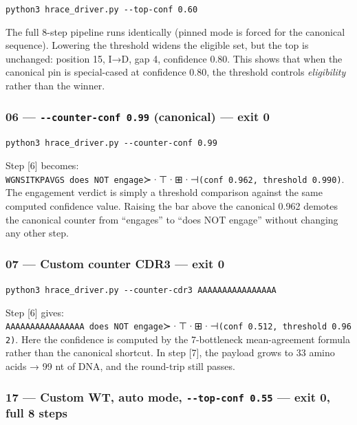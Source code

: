 \documentclass[12pt,a4paper]{article}
\begin{document}
\texttt{python3\ hrace\_driver.py\ -\/-top-conf\ 0.60}

The full 8-step pipeline runs identically (pinned mode is forced for the
canonical sequence). Lowering the threshold widens the eligible set, but
the top is unchanged: position 15, I→D, gap 4, confidence 0.80. This
shows that when the canonical pin is special-cased at confidence 0.80,
the threshold controls \emph{eligibility} rather than the winner.

\hypertarget{counter-conf-0.99-canonical-exit-0}{%
\subsubsection{\texorpdfstring{06 --- \texttt{-\/-counter-conf\ 0.99}
(canonical) --- exit
0}{06 --- -\/-counter-conf 0.99 (canonical) --- exit 0}}\label{counter-conf-0.99-canonical-exit-0}}

\texttt{python3\ hrace\_driver.py\ -\/-counter-conf\ 0.99}

Step {[}6{]} becomes:
\texttt{WGNSITKPAVGS\ does\ NOT\ engage}≻·⊤·⊞·⊣\texttt{(conf\ 0.962,\ threshold\ 0.990)}.
The engagement verdict is simply a threshold comparison against the same
computed confidence value. Raising the bar above the canonical 0.962
demotes the canonical counter from ``engages'' to ``does NOT engage''
without changing any other step.

\hypertarget{custom-counter-cdr3-exit-0}{%
\subsubsection{07 --- Custom counter CDR3 --- exit
0}\label{custom-counter-cdr3-exit-0}}

\texttt{python3\ hrace\_driver.py\ -\/-counter-cdr3\ AAAAAAAAAAAAAAAA}

Step {[}6{]} gives:
\texttt{AAAAAAAAAAAAAAAA\ does\ NOT\ engage}≻·⊤·⊞·⊣\texttt{(conf\ 0.512,\ threshold\ 0.962)}.
Here the confidence is computed by the 7-bottleneck mean-agreement
formula rather than the canonical shortcut. In step {[}7{]}, the payload
grows to 33 amino acids → 99 nt of DNA, and the round-trip still passes.

\hypertarget{custom-wt-auto-mode---top-conf-0.55-exit-0-full-8-steps}{%
\subsubsection{\texorpdfstring{17 --- Custom WT, auto mode,
\texttt{-\/-top-conf\ 0.55} --- exit 0, full 8
steps}{17 --- Custom WT, auto mode, -\/-top-conf 0.55 --- exit 0, full 8 steps}}\label{custom-wt-auto-mode---top-conf-0.55-exit-0-full-8-steps}}
\end{document}
